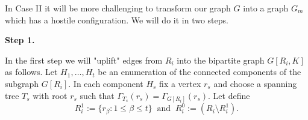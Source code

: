 \documentclass[11pt]{elsarticle}
\theoremstyle{plain}
\theoremstyle{definition}
\begin{document}
\noindent In Case II it will be more challenging  to transform  our graph $G$ into a graph $G_m$ which has a hostile configuration. We will do it in two steps.

\medskip \noindent\textbf{Step 1.}

In the first step we will "uplift" edges from $R_i$ into the bipartite graph $G[R_i,K]$
 as follows. Let $H_1,\ldots, H_t$ be an enumeration of the connected components of the subgraph $G[R_i].$ In each component $H_s$ fix  a vertex  $r_s$ and choose a spanning tree $T_s$ with root $r_s$ such that $\Gamma_{T_s}(r_s)= \Gamma_{G[R_i]}(r_s).$
Let define
\begin{equation}\label{eq:R0iR1i}
    R^1_i := \{ r_\beta : 1\le \beta \le t\} \ \text{ and }\ R^0_i :=  (R_i \setminus R^1_i).
\end{equation}
\end{document}
